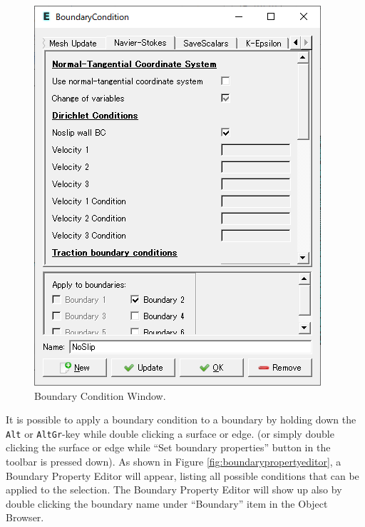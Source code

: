 \begin{figure}[htb]
\begin{center}
 \includegraphics[scale=0.5]{images/boundarycondition.png}
\caption{Boundary Condition Window.}
\label{fig:boundarycondition}
\end{center}
\end{figure}

It is possible to apply a boundary condition to a boundary by holding down 
the \texttt{Alt} or \texttt{AltGr}-key while double clicking a surface or edge. (or simply double clicking the surface or edge while ``Set boundary properties'' button in the toolbar is pressed down).
As shown in Figure \ref{fig:boundarypropertyeditor}, a Boundary Property Editor will appear, listing all possible conditions that can be applied to the selection. The Boundary Property Editor will show up also by double clicking the boundary name under ``Boundary'' item in the Object Browser. 

